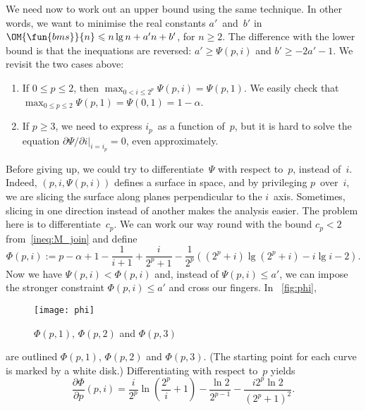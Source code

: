 We need now to work out an upper bound using the same technique. In
other words, we want to minimise the real constants \(a'\)~and~\(b'\)
in \(\OM{\fun{bms}}{n} \leqslant n\lg n + a'n + b'\), for \(n
\geqslant 2\). The difference with the lower bound is that the
inequations are reversed: \(a'\geqslant \Psi(p,i)\) and \(b' \geqslant
-2a' - 1\). We revisit the two cases above:
\begin{enumerate}

  \item If \(0 \leqslant p \leqslant 2\), then \(\max_{0 < i \leqslant
    2^p}\Psi(p,i) = \Psi(p,1)\). We easily check that \(\max_{0
    \leqslant p \leqslant 2}\Psi(p,1) = \Psi(0,1) = 1 - \alpha\).

  \item If \(p \geqslant 3\), we need to express \(i_p\)~as a function
    of~\(p\), but it is hard to solve the equation
    \(\left.\partial\Psi/\partial i\right|_{i=i_p} = 0\), even
    approximately.

\end{enumerate}
Before giving up, we could try to differentiate~\(\Psi\) with respect
to~\(p\), instead of~\(i\). Indeed, \((p,i,\Psi(p,i))\) defines a
surface in space, and by privileging \(p\)~over~\(i\), we are slicing
the surface along planes perpendicular to the \(i\)~axis. Sometimes,
slicing in one direction instead of another makes the analysis
easier. The problem here is to differentiate~\(c_p\). We can work our
way round with the bound \(c_p < 2\) from~\eqref{ineq:M_join}
 and define
\begin{equation*}
  \Phi(p,i) := p - \alpha + 1 - \frac{1}{i+1} + \frac{i}{2^p+1} -
  \frac{1}{2^p}((2^p+i)\lg(2^p+i) - i\lg i - 2).
\end{equation*}
Now we have \(\Psi(p,i) < \Phi(p,i)\) and, instead of \(\Psi(p,i)
\leqslant a'\), we can impose the stronger constraint \(\Phi(p,i)
\leqslant a'\) and cross our fingers. In \fig~\vref{fig:phi},
\begin{figure}
\centering
\texttt{[image: phi]}
\caption{\(\Phi(p,1)\), \(\Phi(p,2)\) and \(\Phi(p,3)\)}
\label{fig:phi}
\end{figure}
are outlined \(\Phi(p,1)\), \(\Phi(p,2)\) and \(\Phi(p,3)\). (The
starting point for each curve is marked by a white disk.)
Differentiating with respect to~\(p\) yields
\begin{equation*}
\frac{\partial\Phi}{\partial p}(p,i) =
\frac{i}{2^p}\ln\left(\frac{2^p}{i}+1\right)
- \frac{\ln 2}{2^{p-1}} - \frac{i2^p\ln 2}{(2^p+1)^2}.
\end{equation*}
